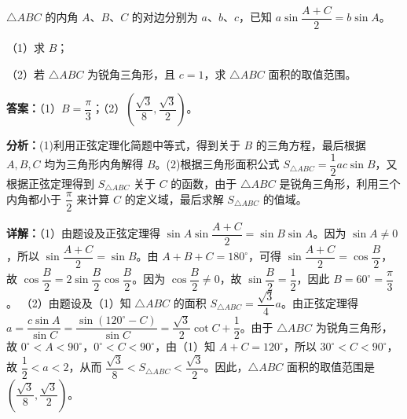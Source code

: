 \begin{question}[points=12]
$\triangle ABC$ 的内角 $A$、$B$、$C$ 的对边分别为 $a$、$b$、$c$，已知 $a\sin\dfrac{A+C}{2} = b\sin A$。

（1）求 $B$；

（2）若 $\triangle ABC$ 为锐角三角形，且 $c=1$，求 $\triangle ABC$ 面积的取值范围。
\begin{solution}
\textbf{答案：}（1）$B = \dfrac{\pi}{3}$；（2）$\left(\dfrac{\sqrt{3}}{8},\dfrac{\sqrt{3}}{2}\right)$。

\textbf{分析：}(1)利用正弦定理化简题中等式，得到关于 $B$ 的三角方程，最后根据 $A,B,C$ 均为三角形内角解得 $B$。(2)根据三角形面积公式 $S_{\triangle ABC} = \dfrac{1}{2}ac\sin B$，又根据正弦定理得到 $S_{\triangle ABC}$ 关于 $C$ 的函数，由于 $\triangle ABC$ 是锐角三角形，利用三个内角都小于 $\dfrac{\pi}{2}$ 来计算 $C$ 的定义域，最后求解 $S_{\triangle ABC}$ 的值域。

\textbf{详解：}（1）由题设及正弦定理得 $\sin A\sin\dfrac{A+C}{2} = \sin B\sin A$。因为 $\sin A\neq 0$，所以 $\sin\dfrac{A+C}{2} = \sin B$。由 $A+B+C=180^\circ$，可得 $\sin\dfrac{A+C}{2} = \cos\dfrac{B}{2}$，故 $\cos\dfrac{B}{2} = 2\sin\dfrac{B}{2}\cos\dfrac{B}{2}$。因为 $\cos\dfrac{B}{2}\neq 0$，故 $\sin\dfrac{B}{2} = \dfrac{1}{2}$，因此 $B=60^\circ = \dfrac{\pi}{3}$。
（2）由题设及（1）知 $\triangle ABC$ 的面积 $S_{\triangle ABC} = \dfrac{\sqrt{3}}{4}a$。由正弦定理得 $a = \dfrac{c\sin A}{\sin C} = \dfrac{\sin(120^\circ - C)}{\sin C} = \dfrac{\sqrt{3}}{2}\cot C + \dfrac{1}{2}$。由于 $\triangle ABC$ 为锐角三角形，故 $0^\circ < A < 90^\circ$，$0^\circ < C < 90^\circ$，由（1）知 $A+C=120^\circ$，所以 $30^\circ < C < 90^\circ$，故 $\dfrac{1}{2} < a < 2$，从而 $\dfrac{\sqrt{3}}{8} < S_{\triangle ABC} < \dfrac{\sqrt{3}}{2}$。因此，$\triangle ABC$ 面积的取值范围是 $\left(\dfrac{\sqrt{3}}{8},\dfrac{\sqrt{3}}{2}\right)$。
\end{solution}
\end{question}

